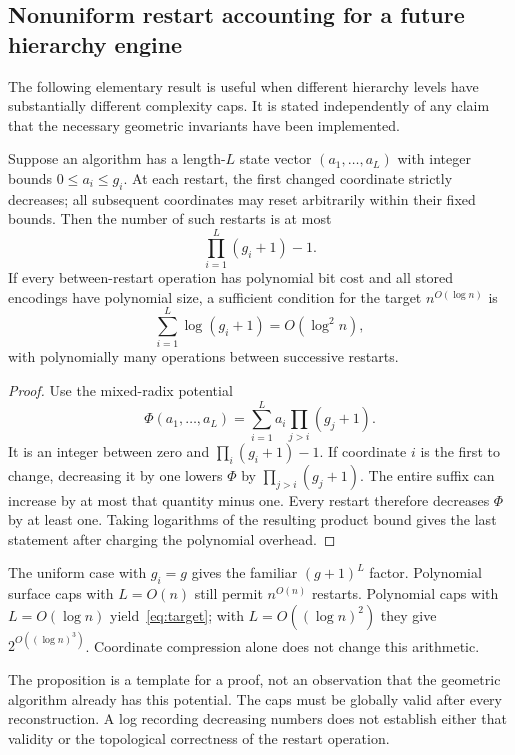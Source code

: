\subsection{Nonuniform restart accounting for a future hierarchy engine}
The following elementary result is useful when different hierarchy levels
have substantially different complexity caps. It is stated independently of
any claim that the necessary geometric invariants have been implemented.

\begin{proposition}\label{prop:radix}
Suppose an algorithm has a length-$L$ state vector
$(a_1,\ldots,a_L)$ with integer bounds $0\le a_i\le g_i$. At each restart,
the first changed coordinate strictly decreases; all subsequent coordinates
may reset arbitrarily within their fixed bounds. Then the number of such
restarts is at most
\[
 \prod_{i=1}^{L}(g_i+1)-1.
\]
If every between-restart operation has polynomial bit cost and all stored
encodings have polynomial size, a sufficient condition for the target
$n^{O(\log n)}$ is
\[
 \sum_{i=1}^{L}\log(g_i+1)=O(\log^2 n),
\]
with polynomially many operations between successive restarts.
\end{proposition}
\begin{proof}
Use the mixed-radix potential
\[
 \Phi(a_1,\ldots,a_L)=\sum_{i=1}^{L}a_i\prod_{j>i}(g_j+1).
\]
It is an integer between zero and $\prod_i(g_i+1)-1$. If coordinate $i$
is the first to change, decreasing it by one lowers $\Phi$ by
$\prod_{j>i}(g_j+1)$. The entire suffix can increase by at most that
quantity minus one. Every restart therefore decreases $\Phi$ by at least
one. Taking logarithms of the resulting product bound gives the last
statement after charging the polynomial overhead.
\end{proof}

The uniform case with $g_i=g$ gives the familiar $(g+1)^L$ factor. Polynomial
surface caps with $L=O(n)$ still permit $n^{O(n)}$ restarts. Polynomial caps
with $L=O(\log n)$ yield~\eqref{eq:target}; with
$L=O((\log n)^2)$ they give $2^{O((\log n)^3)}$. Coordinate compression
alone does not change this arithmetic.

The proposition is a template for a proof, not an observation that the
geometric algorithm already has this potential. The caps must be globally
valid after every reconstruction. A log recording decreasing numbers does
not establish either that validity or the topological correctness of the
restart operation.

